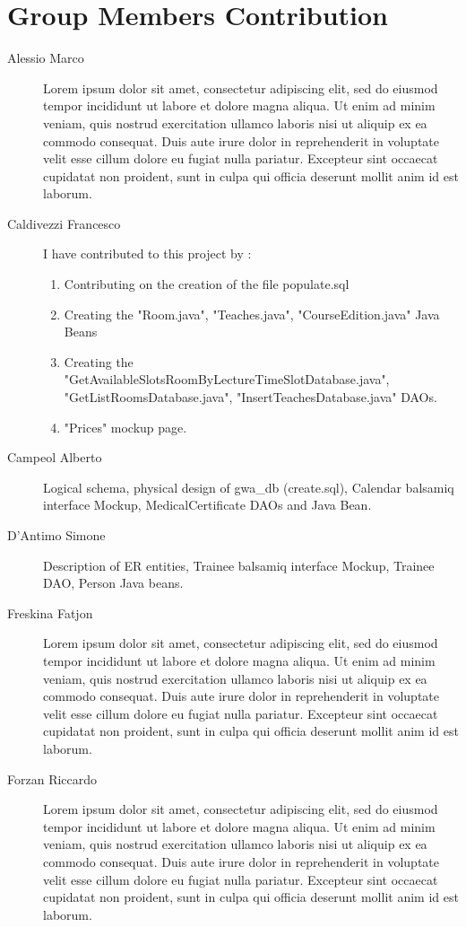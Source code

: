 \section{Group Members Contribution}


\begin{description}
	\item[Alessio Marco] Lorem ipsum dolor sit amet, consectetur adipiscing elit, sed do eiusmod tempor incididunt ut labore et dolore magna aliqua. Ut enim ad minim veniam, quis nostrud exercitation ullamco laboris nisi ut aliquip ex ea commodo consequat. Duis aute irure dolor in reprehenderit in voluptate velit esse cillum dolore eu fugiat nulla pariatur. Excepteur sint occaecat cupidatat non proident, sunt in culpa qui officia deserunt mollit anim id est laborum.
	\item[Caldivezzi Francesco] I have contributed to this project by :
	\begin{enumerate}
		\item Contributing on the creation of the file populate.sql
		\item Creating the "Room.java", "Teaches.java", "CourseEdition.java" Java Beans
		\item Creating the "GetAvailableSlotsRoomByLectureTimeSlotDatabase.java", "GetListRoomsDatabase.java", "InsertTeachesDatabase.java" DAOs.
		\item "Prices" mockup page.		
	\end{enumerate}
	\item[Campeol Alberto] Logical schema, physical design of gwa\_db (create.sql), Calendar balsamiq interface Mockup, MedicalCertificate DAOs and Java Bean.
	\item[D'Antimo Simone] Description of ER entities, Trainee balsamiq interface Mockup, Trainee DAO, Person Java beans.
	\item[Freskina Fatjon] Lorem ipsum dolor sit amet, consectetur adipiscing elit, sed do eiusmod tempor incididunt ut labore et dolore magna aliqua. Ut enim ad minim veniam, quis nostrud exercitation ullamco laboris nisi ut aliquip ex ea commodo consequat. Duis aute irure dolor in reprehenderit in voluptate velit esse cillum dolore eu fugiat nulla pariatur. Excepteur sint occaecat cupidatat non proident, sunt in culpa qui officia deserunt mollit anim id est laborum.
	\item[Forzan Riccardo] Lorem ipsum dolor sit amet, consectetur adipiscing elit, sed do eiusmod tempor incididunt ut labore et dolore magna aliqua. Ut enim ad minim veniam, quis nostrud exercitation ullamco laboris nisi ut aliquip ex ea commodo consequat. Duis aute irure dolor in reprehenderit in voluptate velit esse cillum dolore eu fugiat nulla pariatur. Excepteur sint occaecat cupidatat non proident, sunt in culpa qui officia deserunt mollit anim id est laborum.

\end{description}
